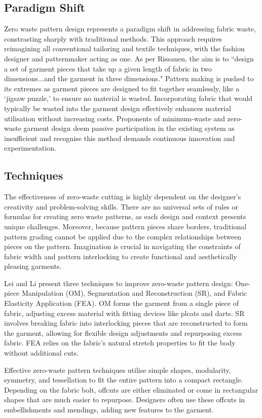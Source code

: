 \subsection{Paradigm Shift}
Zero waste pattern design represents a paradigm shift in addressing fabric waste, constrasting sharply with traditional methods. This approach requires reimagining all conventional tailoring and textile techniques, with the fashion designer and patternmaker acting as one. As per Rissanen, the aim is to ``design a set of garment pieces that take up a given length of fabric in two dimensions...and the garment in three dimensions." Pattern making is pushed to its extremes as garment pieces are designed to fit together seamlessly, like a `jigsaw puzzle,' to ensure no material is wasted. Incorporating fabric that would typically be wasted into the garment design effectively enhances material utilisation without increasing costs. Proponents of minimum-waste and zero-waste garment design deem passive participation in the existing system as insufficient and recognise this method demands continuous innovation and experimentation.

\subsection{Techniques}
The effectiveness of zero-waste cutting is highly dependent on the designer's creativity and problem-solving skills. There are no universal sets of rules or formulas for creating zero waste patterns, as each design and context presents unique challenges. Moreover, because pattern pieces share borders, traditional pattern grading cannot be applied due to the complex relationships between pieces on the pattern. Imagination is crucial in navigating the constraints of fabric width and pattern interlocking to create functional and aesthetically pleasing garments.

Lei and Li present three techniques to improve zero-waste pattern design: One-piece Manipulation (OM), Segmentation and Reconstruction (SR), and Fabric Elasticity Application (FEA). OM forms the garment from a single piece of fabric, adjusting excess material with fitting devices like pleats and darts. SR involves breaking fabric into interlocking pieces that are reconstructed to form the garment, allowing for flexible design adjustments and repurposing excess fabric. FEA relies on the fabric's natural stretch properties to fit the body without additional cuts.

Effective zero-waste pattern techniques utilise simple shapes, modularity, symmetry, and tessellation to fit the entire pattern into a compact rectangle. Depending on the fabric bolt, offcuts are either eliminated or come in rectangular shapes that are much easier to repurpose. Designers often use these offcuts in embellishments and mendings, adding new features to the garment.

